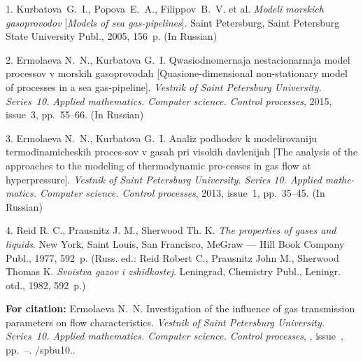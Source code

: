 {\footnotesize

\vskip 3mm


\vskip 2mm


1.   Kurbatova~G.~I.,  Popova~E.~A.,  Filippov~B.~V. et al.
\textit{Modeli morskich gasoprovodov} [\textit{Models of sea
gas-pipelines}]. Saint Petersburg, Saint Petersburg State
University Publ.,  2005, 156~p. (In Russian)


2.  Ermolaeva N.~N., Kurbatova G.~I. Qwasiodnomernaja
nestacionarnaja model processov v morskih gasoprovodah
[Quasione-dimensional non-stationary model of processes in a sea
gas-pipeline]. \textit{Vestnik of Saint Petersburg University.
Series~10. Applied mathematics. Computer science. Control
processes}, 2015, issue~3, pp.~55--66.    (In Russian)

3. Ermolaeva N.~N., Kurbatova G.~I. Analiz podhodov k
modelirovaniju termodinamicheskih proces-\linebreak sov v gasah
pri visokih davlenijah  [The analysis of the approaches to the
modeling of thermodynamic pro-\linebreak cesses in gas flow at
hyperpressure]. \textit{Vestnik of Saint Petersburg University.
Series 10. Applied mathe-\linebreak matics. Computer science.
Control processes}, 2013, issue~1, pp.~35--45. (In Russian)


4.  Reid R. C., Prausnitz J. M., Sherwood Th. K. \textit{The
properties of gases and liquids}.  New  York, Saint Louis, San
Francisco, MeGraw
--- Hill  Book  Company Publ., 1977, 592~p. (Russ. ed.: Reid Robert
C., Prausnitz John M., Sherwood Thomas K. \textit{Svoistva gazov i
zshidkostej}. Leningrad, Chemistry Publ., Leningr. otd., 1982,
592~p.)


\vskip 2mm

{\bf For citation:} Ermolaeva N.~N. Investigation of the influence
of gas transmission parameters on flow characteristics. {\it
Vestnik of Saint Petersburg University. Series~10. Applied
mathematics. Computer science. Control processes}, \issueyear,
issue~\issuenum, pp.~\pageref{p5}--\pageref{p5e}.
\doivyp/spbu10.\issueyear.


}
